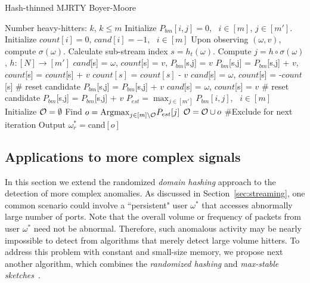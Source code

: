 \documentclass[10pt, conference, letterpaper,onecolumn]{IEEEtranv1.8}
\theoremstyle{plain}\newtheorem{thm}{Theorem}\newtheorem{lem}{Lemma}
\theoremstyle{definition}
\begin{document}
\setcounter{algorithm}{2} 
\begin{algorithm}[t]
\caption{Hash-thinned MJRTY Boyer-Moore}
\label{alg:bm}
\begin{algorithmic}[1]
\REQUIRE Number heavy-hitters: $k$, $k\le m$
\STATE [Start]  Initialize  $P_{bm}[i,j]=0$, \ $i\in[m]$, $j\in [m']$. 
\STATE Initialize  $count[i] = 0$,  $cand[i] = -1$, \ $i\in[m]$
\STATE Upon observing $(\omega, v)$, compute $\sigma (\omega)$.
\STATE [Thin] Calculate sub-stream index $s=h_t(\omega)$.
\STATE [Hash] Compute $j = h \circ \sigma(\omega)$, $h: [N] \to [m']$
\STATE [Update]
   \STATE $cand$[s] = $\omega$, $count$[s] = $v$, $P_{bm}$[s,j] = $v$
\ELSE
         \STATE $P_{bm}$[s,j] =  $P_{bm}$[s,j]  + $v$, $count$[s] =  $count$[s] + $v$
     \ELSE
               \STATE $count[s]$ = $count[s]$ - $v$
                    \STATE $cand$[s] = $\omega$, $count$[s] = -$count$[s]   {\# reset candidate}
               \ENDIF
               \STATE $P_{bm}$[s,j] =  $P_{bm}$[s,j]  + $v$
          \ELSE 
             \STATE  $cand$[s] = $\omega$,  $count$[s] = $v$ {\# reset candidate}
             \STATE  $P_{bm}$[s,j] = $P_{bm}$[s,j]  + $v$ 
          \ENDIF   
    \ENDIF
\ENDIF
{}
     \STATE $P_{est} = \max_{j\in[m']} P_{bm}[i,j]$, \ $i\in[m]$
       \STATE Initialize ${\cal O} = \emptyset$
        \STATE Find $o = {\rm Argmax}_{j\in[m] \setminus {\cal O}} P_{est}[j]$ 
        \STATE ${\cal O}  = {\cal O} \cup  o $  {\#Exclude for next iteration }
         \STATE Output $\omega_r^* = $cand$[o]$ 
  \ENDFOR
\ENDIF
\end{algorithmic}
\end{algorithm} 
 
 
 
\subsection{Applications to more complex signals}
\label{sec:ms}

 In this section we extend the randomized  {\em domain hashing} approach to the detection of more 
 complex anomalies. As discussed in Section~\ref{sec:streaming}, one common scenario could involve 
a ``persistent" user $\omega^*$ that accesses abnormally large
 number of ports.  Note that the overall volume or frequency of packets from user $\omega^*$ need not be abnormal. Therefore, such anomalous activity may be
 nearly impossible to detect from  algorithms that merely detect large volume hitters. 
 To address this problem with constant and small-size memory, 
 we propose next another algorithm, which combines the {\em randomized hashing} and
 {\em max-stable sketches}~\cite{4221749}.
 
\end{document}

